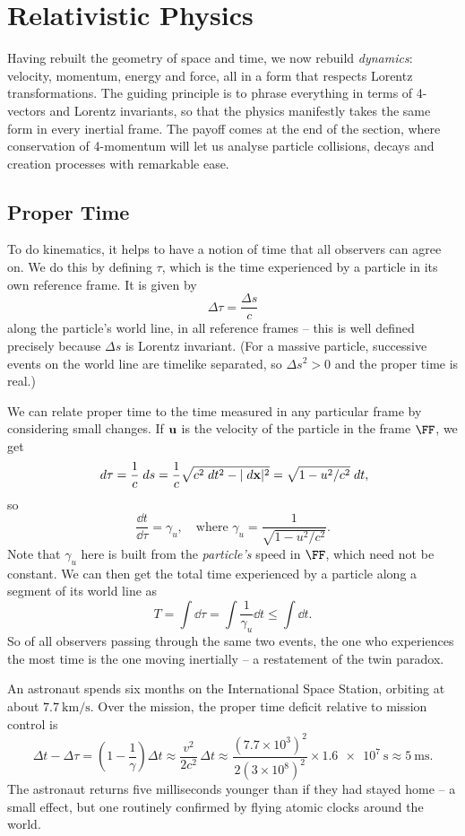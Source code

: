 \documentclass[a4paper]{scrartcl}
\begin{document}
\section{Relativistic Physics}

Having rebuilt the geometry of space and time, we now rebuild \emph{dynamics}: velocity, momentum, energy and force, all in a form that respects Lorentz transformations. The guiding principle is to phrase everything in terms of 4-vectors and Lorentz invariants, so that the physics manifestly takes the same form in every inertial frame. The payoff comes at the end of the section, where conservation of 4-momentum will let us analyse particle collisions, decays and creation processes with remarkable ease.

\subsection{Proper Time}

To do kinematics, it helps to have a notion of time that all observers can agree on. We do this by defining  $\tau$, which is the time experienced by a particle in its own reference frame. It is given by
$$
\Delta \tau = \frac{\Delta s}{c}
$$
along the particle's world line, in all reference frames -- this is well defined precisely because $\Delta s$ is Lorentz invariant. (For a massive particle, successive events on the world line are timelike separated, so $\Delta s^2 > 0$ and the proper time is real.)

We can relate proper time to the time measured in any particular frame by considering small changes. If $\mathbf{u}$ is the velocity of the particle in the frame $\FF$, we get
$$
\; d \tau = \frac{1}{c} \; d s = \frac{1}{c} \sqrt{c^2 \; d t^2 - |\; d\mathbf{x}|^2} = \sqrt{1 - u^2/c^2}\; d t,
$$
so
$$
\frac{\dd t}{\dd \tau} = \gamma_u, \quad \text{where } \gamma_u = \frac{1}{\sqrt{1 - u^2/c^2}}.
$$
Note that $\gamma_u$ here is built from the \emph{particle's} speed in $\FF$, which need not be constant. We can then get the total time experienced by a particle along a segment of its world line as
$$
T = \int \dd \tau = \int \frac{1}{\gamma_u} \dd t \leq \int \dd t.
$$
So of all observers passing through the same two events, the one who experiences the most time is the one moving inertially -- a restatement of the twin paradox.

\begin{example}
	An astronaut spends six months on the International Space Station, orbiting at about $\SI{7.7}{\kilo\meter\per\second}$. Over the mission, the proper time deficit relative to mission control is
	$$
	\Delta t - \Delta \tau = \left(1 - \frac{1}{\gamma}\right)\Delta t \approx \frac{v^2}{2c^2}\, \Delta t \approx \frac{(7.7 \times 10^3)^2}{2(3\times 10^8)^2} \times \SI{1.6e7}{\second} \approx \SI{5}{\milli\second}.
	$$
	The astronaut returns five milliseconds younger than if they had stayed home -- a small effect, but one routinely confirmed by flying atomic clocks around the world.
\end{example}
\end{document}
